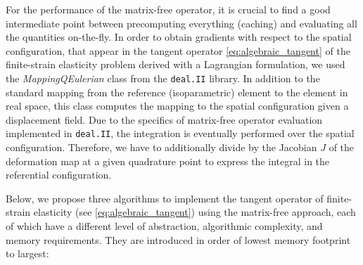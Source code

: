 \documentclass[times,doublespace]{nmeauth}
\begin{document}
For the performance of the matrix-free operator, it is crucial to find a good intermediate point between precomputing everything (caching) and evaluating all the quantities on-the-fly.
%
In order to obtain gradients with respect to the spatial configuration,
that appear in the tangent operator \eqref{eq:algebraic_tangent} of the finite-strain elasticity problem derived with a Lagrangian formulation,
we used the \textit{MappingQEulerian} class from the \texttt{deal.II} \cite{dealII90} library.
In addition to the standard mapping from the reference (isoparametric) element to the element in real space, this class computes the mapping to the spatial configuration given a displacement field.
%
Due to the specifics of matrix-free operator evaluation implemented in \texttt{deal.II}, the integration is eventually performed over the spatial configuration.
Therefore, we have to additionally divide by the Jacobian $J$ of the deformation map at a given quadrature point to express the integral in the referential configuration.

Below, we propose three algorithms to implement the tangent operator of finite-strain elasticity (see \eqref{eq:algebraic_tangent}) using the matrix-free approach, each of which have a different level of abstraction, algorithmic complexity, and memory requirements.
They are introduced in order of lowest memory footprint to largest:
\end{document}
